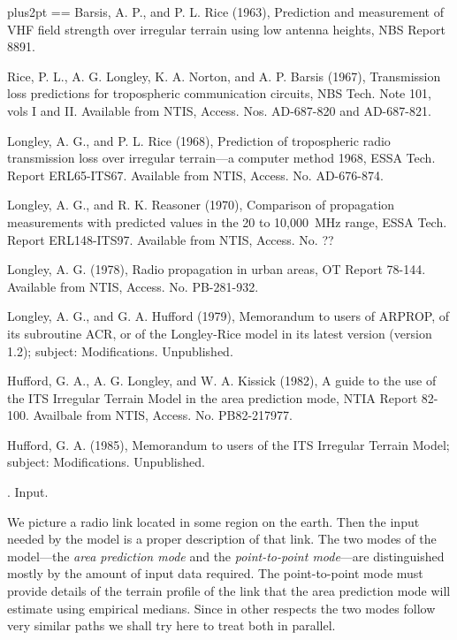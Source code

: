    \begingroup 
      \parindent=20pt \parskip=6pt plus2pt 
      \def\[#1]{\indent\llap{[#1]\enspace}\ignorespaces} 
      \frenchspacing \everypar={\hangindent=\parindent}
   Barsis, A. P., and P. L. Rice (1963), Prediction and measurement of VHF
   field strength over irregular terrain using low antenna heights, NBS
   Report 8891.

   Rice, P. L., A. G. Longley, K. A. Norton, and A. P. Barsis (1967),
   Transmission loss predictions for tropospheric communication circuits,
   NBS Tech. Note 101, vols I and II.  Available from NTIS, Access. Nos.
   AD-687-820 and AD-687-821.

   Longley, A. G., and P. L. Rice (1968), Prediction of tropospheric radio
   transmission loss over irregular terrain---a computer method 1968, ESSA
   Tech. Report ERL65-ITS67.  Available from NTIS, Access. No. AD-676-874.

   Longley, A. G., and R. K. Reasoner (1970), Comparison of propagation
   measurements with predicted values in the 20 to 10,000~MHz range, ESSA
   Tech. Report ERL148-ITS97.  Available from NTIS, Access. No. ??

   Longley, A. G. (1978), Radio propagation in urban areas, OT Report
   78-144.  Available from NTIS, Access. No. PB-281-932.

   Longley, A. G., and G. A. Hufford (1979), Memorandum to users of ARPROP,
   of its subroutine ACR, or of the Longley-Rice model in its latest
   version (version 1.2); subject: Modifications.  Unpublished.

   Hufford, G. A., A. G. Longley, and W. A. Kissick (1982), A guide to the
   use of the ITS Irregular Terrain Model in the area prediction mode, NTIA
   Report 82-100.  Availbale from NTIS, Access. No. PB82-217977.

   Hufford, G. A. (1985), Memorandum to users of the ITS Irregular Terrain
   Model; subject: Modifications.  Unpublished.

   \endgroup
   . Input.

   We picture a radio link located in some region on the earth.  Then the
   input needed by the model is a proper description of that link.
   The two modes of the model---the {\it area prediction mode} and the {\it
   point-to-point mode}---are distinguished mostly by the amount of input
   data required.  The point-to-point mode must provide details of the
   terrain profile of the link that the area prediction mode will estimate
   using empirical medians.  Since in other respects the two modes follow
   very similar paths we shall try here to treat both in parallel. 

\]
